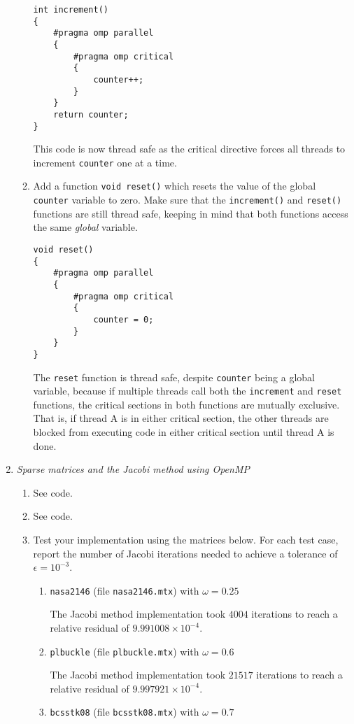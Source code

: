 \documentclass{article}
\begin{document}
\begin{enumerate}
\begin{enumerate}
\begin{lstlisting}[style=C]
int increment()
{
    #pragma omp parallel
    {
        #pragma omp critical
        {
            counter++;
        }
    }
    return counter;
}
    \end{lstlisting}
        This code is now thread safe as the critical directive forces all threads to increment \verb|counter| one at a time.
        \item Add a function \verb|void reset()| which resets the value of the global \verb|counter| variable to zero.
        Make sure that the \verb|increment()| and \verb|reset()| functions are still thread safe, keeping in mind that both functions access the same \textit{global} variable.
\begin{lstlisting}[style=C]
void reset()
{
    #pragma omp parallel
    {
        #pragma omp critical
        {
            counter = 0;
        }
    }
}
    \end{lstlisting}
    The \verb|reset| function is thread safe, despite \verb|counter| being a global variable, because if multiple threads call both the \verb|increment| and \verb|reset| functions, the critical sections in both functions are mutually exclusive.
    That is, if thread A is in either critical section, the other threads are blocked from executing code in either critical section until thread A is done.
    \end{enumerate}
    \item \textit{Sparse matrices and the Jacobi method using OpenMP}
    \begin{enumerate}
        \item See code.
        \item See code.
        \item Test your implementation using the matrices below.
        For each test case, report the number of Jacobi iterations needed to achieve a tolerance of $\epsilon = 10^{-3}$.
        \begin{enumerate}
            \item \verb|nasa2146| (file \verb|nasa2146.mtx|) with $\omega = 0.25$
            \par 
            The Jacobi method implementation took $4004$ iterations to reach a relative residual of $9.991008 \times 10^{-4}$.
            \item \verb|plbuckle| (file \verb|plbuckle.mtx|) with $\omega = 0.6$
            \par 
            The Jacobi method implementation took $21517$ iterations to reach a relative residual of $9.997921 \times 10^{-4}$.
            \item \verb|bcsstk08| (file \verb|bcsstk08.mtx|) with $\omega = 0.7$

\end{enumerate}
\end{enumerate}
\end{enumerate}
\end{document}
